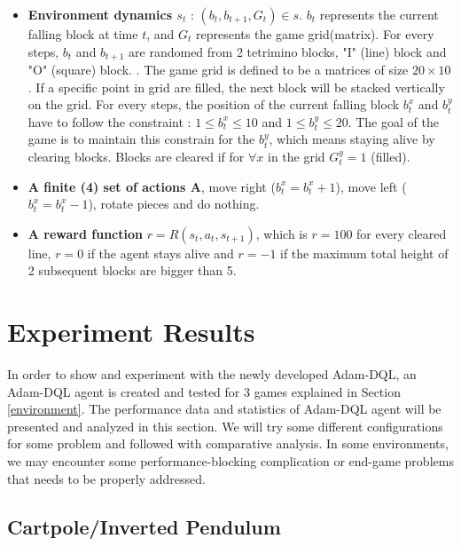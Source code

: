      \begin{itemize}
        \item \textbf{Environment dynamics $s_t$} : $(b_t,b_{t+1},G_t) \in s$. $b_t$ represents the current falling block at time $t$, and $G_t$ represents the game grid(matrix). For every steps, $b_t$ and $b_{t+1}$ are randomed from 2 tetrimino blocks, "I" (line) block and "O" (square) block. . The game grid is defined to be a matrices of size $20 \times 10$. If a specific point in grid are filled, the next block will be stacked vertically on the grid. For every steps, the position of the current falling block $b_t^x$ and $b_t^y$ have to follow the constraint : $1 \leq b_t^x \leq 10$ and  $1 \leq b_t^y \leq 20$. The goal of the game is to maintain this constrain for the $b_t^y$, which means staying alive by clearing blocks. Blocks are cleared if for $\forall x$ in the grid $G_t^y=1$ (filled).
        \item \textbf{A finite (4) set of actions A}, move right ($b_t^x=b_t^x+1$), move left ($b_t^x=b_t^x-1$), rotate pieces and do nothing.
        \item \textbf{A reward function} $r=R(s_t,a_t,s_{t+1})$, which is $r=100$ for every cleared line, $r=0$ if the agent stays alive and $r=-1$ if the maximum total height of 2 subsequent blocks are bigger than 5.
    \end{itemize}
	
    \section{Experiment Results}
    In order to show and experiment with the newly developed Adam-DQL, an Adam-DQL agent is created and tested for 3 games explained in Section \ref{environment}. The performance data and statistics of Adam-DQL agent will be presented and analyzed in this section. We will try some different configurations for some problem and followed with comparative analysis. In some environments, we may encounter some performance-blocking complication or end-game problems that needs to be properly addressed.
    
    \subsection{Cartpole/Inverted Pendulum}
    
